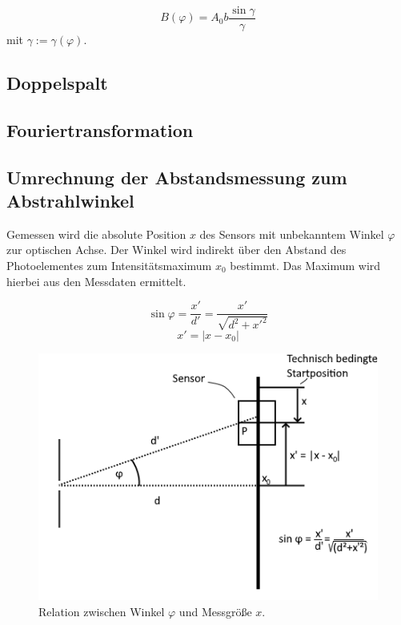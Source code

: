 \begin{equation}
  B(\varphi) = A_0b\frac{\sin{\gamma}}{\gamma}
\end{equation}
mit $\gamma := \gamma(\varphi)$.

\subsection{Doppelspalt}

\subsection{Fouriertransformation}

\subsection{Umrechnung der Abstandsmessung zum Abstrahlwinkel}
Gemessen wird die absolute Position $x$ des Sensors mit unbekanntem Winkel $\varphi$ zur optischen Achse.
Der Winkel wird indirekt über den Abstand des Photoelementes zum Intensitätsmaximum $x_0$ bestimmt.
Das Maximum wird hierbei aus den Messdaten ermittelt.

\begin{equation}
  \sin{\varphi} = \frac{x'}{d'} = \frac{x'}{\sqrt{d^2+x'^2}}
\end{equation}
\begin{equation}
  x' = |x-x_0|
\end{equation}

\begin{figure}
  \centering
  \includegraphics[width=.8\textwidth]{plots/x_to_angle.png}
  \caption{Relation zwischen Winkel $\varphi$ und Messgröße $x$.}
  \label{fig:xToAngle}
\end{figure}